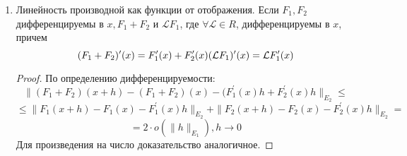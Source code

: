 \begin{theorem}
\begin{enumerate}
\begin{proof}
\[        \]
        \[
            \exists \delta_2 \colon \quad \|\eta\|_{E_2} \leq \|F^\prime (x)\| \cdot \|h\|_{E_1}+\|\mathcal{L}(h)\|_{E_2} < \delta_1, \quad \|h\|_{E_1} < \delta_2
        \]
        Теперь мы можем оценить через ??? исходную норму$\colon$
        \[
            \|G \circ F (x+h) - G\circ F (x)-G^\prime (y) F^\prime (x) h \|_{E_3} = 
        \]
        \[
            =\|G \circ (F (x)+\eta) - G\circ F (x)-G^\prime (y) F^\prime (x) h \|_{E_3} = 
        \]
        \[
            =\|G \circ (y+\eta) - G(y)-G^\prime (y) F^\prime (x) h \|_{E_3} \leq
        \]
        \[
            \leq \|G(y+\eta)-G(y)-G^\prime(y)(F^\prime(x)h+\mathcal{L}(h))\|_{E_3} + \|G^\prime (y) \mathcal{L}(h)\|_{E_3} <
        \]
        \[
          < \frac{\varepsilon_1}{2}\|\eta\|_{E_2}+\|G^\prime(y)\| \cdot \|\mathcal{L}(h)\|_{E_2} \leq
        \]
        \[
          \leq \frac{\varepsilon_1}{2}\|F^\prime(x)\| \cdot \|h\|_{E_1}+\frac{\varepsilon_1}{2}\|\mathcal{L}(h)\|_{E_2}+\|G^\prime(y)\| \cdot \|\mathcal{L}(h)\|_{E_2} <
         \]
         \[
           < \varepsilon \|h\|_{E_1}, \|h\|_{E_1} < \delta
        \]
        Последнее неравенство в цепочке спаведливо потому что \[
            \mathcal{L} (h) = o(\|h\|_{E_1})
        \] 
        т.е. слагаемое $\|G^\prime(y)\|\|\mathcal{L}(h)\|_{E_2}$ можно сделать сколь угодно маленьким, а слагаемые $\frac{\varepsilon_1}{2}\|F^\prime(x)\| \cdot \|h\|_{E_1}, \frac{\varepsilon_1}{2}\|\mathcal{L}(h)\|_{E_2}$ можно сделать сколь угодно малыми из-за выбираемого $\varepsilon_1$ (несмотря на то, что перед ним стоит квантор всеобщности, сейчас мы можем потребовать, чтобы например $\varepsilon_1 \colon = \frac{\varepsilon}{6 \|F^\prime (x)\|}$ было достаточно маленьким).
    \end{proof}
    \item Линейность производной как функции от отображения. Если $F_1, F_2$ дифференцируемы в $x, F_1+F_2$ и $\mathcal{L} F_1$, где $\forall \mathcal{L} \in R$, дифференцируемы в $x$, причем 
    \[
        (F_1+F_2)^\prime (x) = F^\prime_1 (x)+F^\prime_2 (x)\\
        (\mathcal{L} F_1)^\prime (x) = \mathcal{L} F^\prime_1(x)
    \]
    \begin{proof}
        По определению дифференцируемости$\colon$ 
        \[
            \|(F_1+F_2)(x+h) - (F_1+F_2)(x) - (F_1^\prime(x) h + F^\prime_2(x) h \|_{E_2} \leq
        \]
        \[
            \leq \|F_1 (x+h) - F_1 (x) - F^\prime_1(x)h\|_{E_2} + \|F_2(x+h) - F_2(x) - F^\prime_2(x)h\|_{E_2} =
        \]
        \[
            = 2\cdot o(\|h\|_{E_1}), h \to 0
        \]
        Для произведения на число доказательство аналогичное.
    \end{proof}
\end{enumerate}
\end{theorem}


